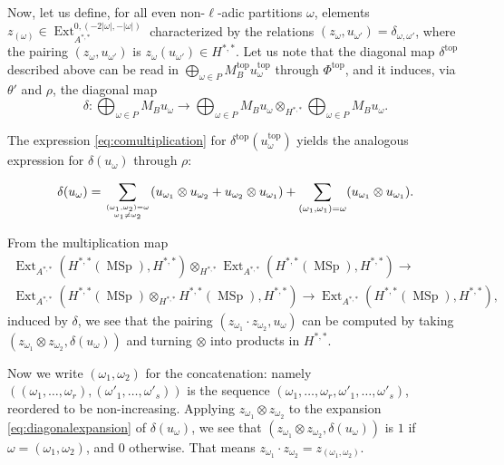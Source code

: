 \documentclass[10pt]{amsart}
\theoremstyle{definition}
\theoremstyle{plain}
\numberwithin{equation}{section}
\newcommand{\0}{\emptyset}
\newcommand{\MSp}{{\operatorname{MSp}}}
\renewcommand{\top}{{\operatorname{top}}}
\newcommand{\Ext}{{\operatorname{Ext}}}
\begin{document}
    Now, let us define, for all even non-$\ell$-adic partitions $\omega$, elements $z_{(\omega)} \in \Ext_{A^{*,*}}^{0,(-2|\omega|,-|\omega|)}$ characterized by the relations $(z_{\omega},u_{\omega'})= \delta_{\omega,\omega'}$, where the pairing $(z_{\omega},u_{\omega'})$ is $z_{\omega}(u_{\omega'})\in H^{*,*}$. Let us note that the diagonal map $\delta^\top$ described above can be read in $\bigoplus_{\omega \in P}M_B^{\top}u_{\omega}^{\top}$ through $\Phi^{\top}$, and it induces, via $\theta'$ and $\rho$, the diagonal map
    $$\delta: \bigoplus_{\omega \in P}M_Bu_{\omega} \to \bigoplus_{\omega \in P}M_Bu_{\omega} \otimes_{H^{*,*}} \bigoplus_{\omega \in P}M_Bu_{\omega}.$$

    The expression \eqref{eq:comultiplication} for $\delta^{\top}(u_{\omega}^{\top})$ yields the analogous expression for $\delta(u_{\omega})$ through $\rho$:

    \begin{equation}
    \label{eq:diagonalexpansion}
        \delta(u_{\omega})= \sum_{{(\omega_1,\omega_2)=\omega} \atop{\omega_1 \neq \omega_2}}(u_{\omega_1} \otimes u_{\omega_2}+u_{\omega_2}\otimes u_{\omega_1}) + \sum_{(\omega_1, \omega_1)=\omega}(u_{\omega_1}\otimes u_{\omega_1}).
    \end{equation}

    From the multiplication map
    \begin{multline*}
        \Ext_{A^{*,*}}(H^{*,*}(\MSp),H^{*,*}) \otimes_{H^{*,*}}\Ext_{A^{*,*}}(H^{*,*}(\MSp),H^{*,*}) \to \\ \Ext_{A^{*,*}}(H^{*,*}(\MSp) \otimes_{H^{*,*}}H^{*,*}(\MSp),H^{*,*}) \to \Ext_{A^{*,*}}(H^{*,*}(\MSp),H^{*,*}),
    \end{multline*}
    induced by $\delta$, we see that the pairing $(z_{\omega_1}\cdot z_{\omega_2},u_{\omega})$ can be computed by taking $(z_{\omega_1}\otimes z_{\omega_2},\delta(u_{\omega}))$ and turning $\otimes$ into products in $H^{*,*}$.
    
    Now we write $(\omega_1,\omega_2)$ for the concatenation: namely $((\omega_1,\ldots, \omega_r),(\omega'_1,\ldots, \omega'_s))$ is the sequence $(\omega_1,\ldots, \omega_r,\omega'_1,\ldots, \omega'_s)$, reordered to be non-increasing. Applying $z_{\omega_1}\otimes z_{\omega_2}$ to the expansion \eqref{eq:diagonalexpansion} of $\delta(u_{\omega})$, we see that $(z_{\omega_1}\otimes z_{\omega_2},\delta(u_{\omega}))$ is $1$ if $\omega=(\omega_1,\omega_2)$, and $0$ otherwise. That means $z_{\omega_1}\cdot z_{\omega_2}=z_{(\omega_1,\omega_2)}$.
    
\end{document}
